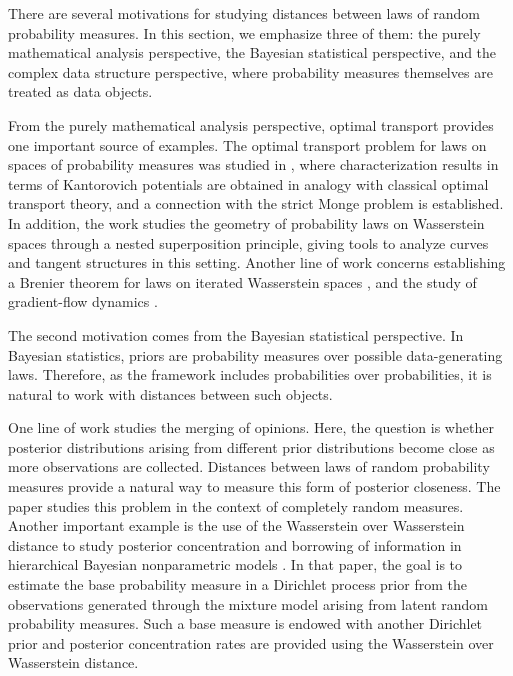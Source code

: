 There are several motivations for studying distances between laws of random probability measures. In this section, we emphasize three of them: the purely mathematical analysis perspective, the Bayesian statistical perspective, and the complex data structure perspective, where probability measures themselves are treated as data objects.

From the purely mathematical analysis perspective, optimal transport provides one important source of examples. The optimal transport problem for laws on spaces of probability measures was studied in \cite{pinzi2026optimal}, where characterization results in terms of Kantorovich potentials are obtained in analogy with classical optimal transport theory, and a connection with the strict Monge problem is established. In addition, the work \cite{pinzi2025nested} studies the geometry of probability laws on Wasserstein spaces through a nested superposition principle, giving tools to analyze curves and tangent structures in this setting. Another line of work concerns establishing a Brenier theorem for laws on iterated Wasserstein spaces \cite{beiglbock2025brenier,pinzi2025totally}, and the study of gradient-flow dynamics \cite{bonet2025flowing}.

The second motivation comes from the Bayesian statistical perspective. In Bayesian statistics, priors are probability measures over possible data-generating laws. Therefore, as the framework includes probabilities over probabilities, it is natural to work with distances between such objects.

One line of work studies the merging of opinions. Here, the question is whether posterior distributions arising from different prior distributions become close as more observations are collected. Distances between laws of random probability measures provide a natural way to measure this form of posterior closeness. The paper \cite{catalano2026merging} studies this problem in the context of completely random measures. Another important example is the use of the Wasserstein over Wasserstein distance to study posterior concentration and borrowing of information in hierarchical Bayesian nonparametric models \cite{nguyen2016borrowing}. In that paper, the goal is to estimate the base probability measure in a Dirichlet process prior from the observations generated through the mixture model arising from latent random probability measures. Such a base measure is endowed with another Dirichlet prior and posterior concentration rates are provided using the Wasserstein over Wasserstein distance.

